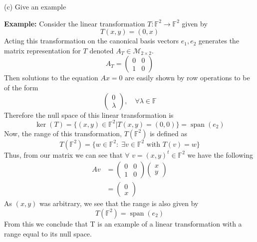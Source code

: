 \documentclass[a4paper, 11pt]{article}
\newcommand{\F}{\mathbb{F}}
\newenvironment{solution}{%
	\begin{list}{}{%
			\setlength{\topsep}{0pt}%
			\setlength{\leftmargin}{1.5cm}%
			\setlength{\rightmargin}{1.5cm}%
			\setlength{\listparindent}{\parindent}%
			\setlength{\itemindent}{\parindent}%
			\setlength{\parsep}{\parskip}%
		}%
		\item[]}{\end{list}}
\begin{document}
\noindent(c) Give an example
	\begin{solution}
		\noindent\textbf{Example:} Consider the linear transformation $T:\F^2\to\F^2$ given by
			\begin{equation*}
				T(x,y) = (0, x) 
			\end{equation*}
		Acting this transformation on the canonical basis vectors $e_1, e_2$ generates the matrix representation for $T$ denoted $A_T \in \mathcal{M}_{2\times2}$. 
			\begin{equation*}
				A_T = \begin{pmatrix}
					0 & 0 \\ 
					1 & 0 
				\end{pmatrix}
			\end{equation*}
		Then solutions to the equation $Ax=0$ are easily shown by row operations to be of the form
			\begin{equation*}
				\begin{pmatrix} 0 \\ \lambda \end{pmatrix}, \quad \forall \lambda\in\F
			\end{equation*}
		Therefore the null space of this linear transformation is
			\begin{equation*}
				\ker(T) = \{(x,y)\in \F^2| T(x,y) = (0,0)\} = \operatorname{span}(e_2)
			\end{equation*}
		Now, the range of this transformation, $T(\F^2)$ is defined as 
			\begin{equation*} 
				T(\F^2) = \{w\in \F^2 :\; \exists v \in \F^2 \text{ with } T(v)=w\}
			\end{equation*}
		Thus, from our matrix we can see that $\forall$ $v=(x,y)^t \in \F^2$ we have the following
			\begin{align*}
				Av &= \begin{pmatrix}0 & 0 \\ 1 & 0\end{pmatrix}\begin{pmatrix}x \\ y\end{pmatrix}\\ 
				&= \begin{pmatrix}0 \\ x\end{pmatrix}
			\end{align*}
		As $(x,y)$ was arbitrary, we see that the range is also given by 
			\begin{equation*} 
				T(\F^2) = \operatorname{span}(e_2)
			\end{equation*}
		From this we conclude that T is an example of a linear transformation with a range equal to its null space. \\ 
	\end{solution}
\end{document}
